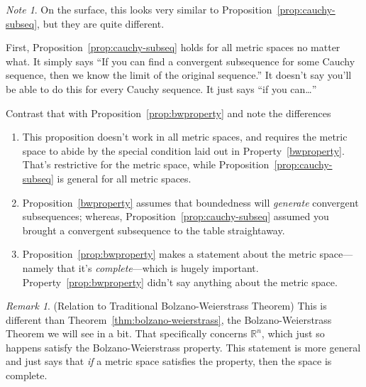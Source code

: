 \documentclass[12pt]{article}
\numberwithin{equation}{section} %
\theoremstyle{plain}
\theoremstyle{definition}
\theoremstyle{remark}
\newtheorem*{rmk}{Remark}
\newtheorem*{note}{Note}
\newcommand{\R}{\mathbb{R}}
\begin{document}
\begin{note}
On the surface, this looks very similar to
Proposition~\ref{prop:cauchy-subseq}, but they are quite different.

First, Proposition~\ref{prop:cauchy-subseq} holds for all metric spaces
no matter what. It simply says ``If you can find a convergent
subsequence for some Cauchy sequence, then we know the limit of the
original sequence.'' It doesn't say you'll be able to do this for every
Cauchy sequence. It just says ``if you can\ldots''

Contrast that with Proposition~\ref{prop:bwproperty} and note the
differences
\begin{enumerate}
  \item This proposition doesn't work in all metric spaces, and requires
    the metric space to abide by the special condition laid out in
    Property~\ref{bwproperty}. That's restrictive for the metric space,
    while Proposition~\ref{prop:cauchy-subseq} is general for all metric
    spaces.
  \item Proposition~\ref{bwproperty} assumes that boundedness
    will \emph{generate} convergent subsequences; whereas,
    Proposition~\ref{prop:cauchy-subseq} assumed you brought a
    convergent subsequence to the table straightaway.
  \item Proposition~\ref{prop:bwproperty} makes a statement about the
    metric space---namely that it's \emph{complete}---which is hugely
    important. Property~\ref{prop:bwproperty} didn't say anything about
    the metric space.
\end{enumerate}
\end{note}

\begin{rmk}
(Relation to Traditional Bolzano-Weierstrass Theorem) This is different
than Theorem~\ref{thm:bolzano-weierstrass}, the Bolzano-Weierstrass
Theorem we will see in a bit. That specifically concerns $\R^n$,
which just so happens satisfy the Bolzano-Weierstrass property. This
statement is more general and just says that \emph{if} a metric space
satisfies the property, then the space is complete.
\end{rmk}
\end{document}
